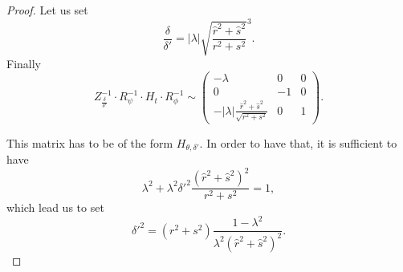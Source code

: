 \begin{proof}
 
\noindent Let us set
 \begin{equation*}
 \frac{\delta}{\delta'}=|\lambda|\sqrt{\frac{\hat r^2 + \hat s^2}{r^2 + s^2}}^{3}.
 \end{equation*}
Finally
\begin{equation*}
Z_{\frac{\delta}{\delta'}}^{-1} \cdot R_{\psi}^{-1} \cdot H_t \cdot R_{\phi}^{-1} \sim 
 \begin{pmatrix}
 -\lambda&0&0\\
0&-1&0\\
 -|\lambda|\frac{\hat r^2 + \hat s^2}{\sqrt{r^2 + s^2}}&0&1
 \end{pmatrix}.
 \end{equation*}
 
\noindent This matrix has to be of the form $H_{\theta,\delta'}$. In order to have that, it is sufficient to have
 \begin{equation*}
  \lambda^2 + \lambda^2 \delta'^2 \frac{(\hat r^2 + \hat s^2)^2}{r^2 + s^2}=1,
 \end{equation*}
\noindent which lead us to set
 \begin{equation*}
  \delta'^2 = (r^2 + s^2) \frac{1-\lambda^2}{\lambda^2 (\hat r^2+\hat s^2)^2}.
 \end{equation*}
\end{proof}
